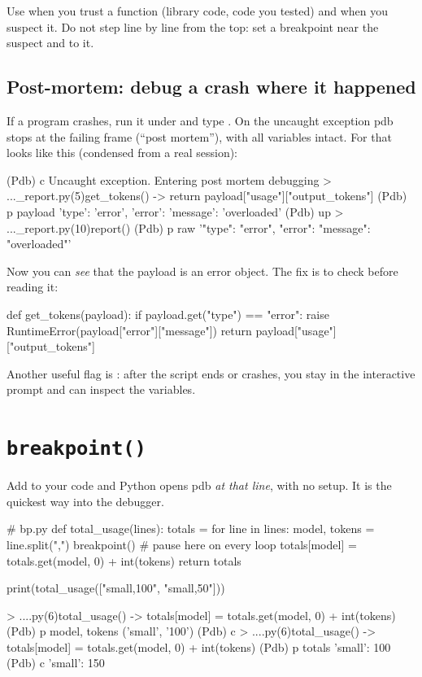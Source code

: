 \begin{gamerule}
Use  when you trust a function (library code, code you tested) and  when you suspect it. Do not step line by line from the
top: set a breakpoint near the suspect and  to it.
\end{gamerule}

\subsection{Post-mortem: debug a crash where it happened}

If a program crashes, run it under  and type . On the uncaught exception pdb stops at the failing frame (``post mortem''),
with all variables intact. For  that looks like this (condensed from a real session):

\begin{rawcode}
(Pdb) c
Uncaught exception. Entering post mortem debugging
> ...\usage_report.py(5)get_tokens()
-> return payload["usage"]["output_tokens"]
(Pdb) p payload
{'type': 'error', 'error': {'message': 'overloaded'}}
(Pdb) up
> ...\usage_report.py(10)report()
(Pdb) p raw
'{"type": "error", "error": {"message": "overloaded"}}'
\end{rawcode}

Now you can \emph{see} that the payload is an error object. The fix is to check before reading it:

\begin{pycode}
def get_tokens(payload):
    if payload.get("type") == "error":
        raise RuntimeError(payload["error"]["message"])
    return payload["usage"]["output_tokens"]
\end{pycode}

Another useful flag is : after the script ends or crashes, you stay in the interactive prompt and can inspect the variables.

\section{\texttt{breakpoint()}}

Add  to your code and Python opens pdb \emph{at that line}, with no setup. It is the quickest way into the debugger.

\begin{pycode}
# bp.py
def total_usage(lines):
    totals = {}
    for line in lines:
        model, tokens = line.split(",")
        breakpoint()                       # pause here on every loop
        totals[model] = totals.get(model, 0) + int(tokens)
    return totals

print(total_usage(["small,100", "small,50"]))
\end{pycode}
\begin{rawcode}
> ...\bp.py(6)total_usage()
-> totals[model] = totals.get(model, 0) + int(tokens)
(Pdb) p model, tokens
('small', '100')
(Pdb) c
> ...\bp.py(6)total_usage()
-> totals[model] = totals.get(model, 0) + int(tokens)
(Pdb) p totals
{'small': 100}
(Pdb) c
{'small': 150}
\end{rawcode}

